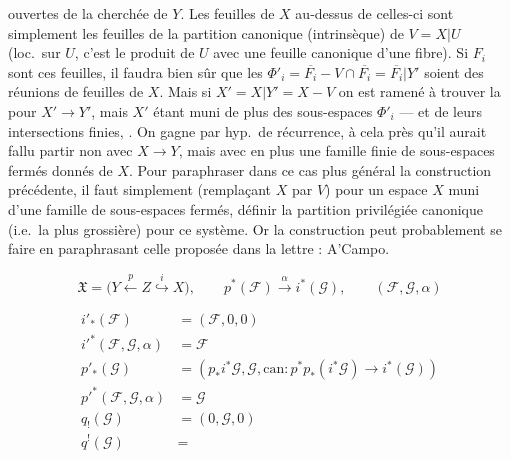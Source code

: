 \documentclass[11pt,a4paper]{article}
\begin{document}
ouvertes de la \struck{\ill{}}  cherchée de $Y$. Les feuilles
de $X$ au-dessus de celles-ci sont simplement les feuilles de la partition
 canonique (intrinsèque) de $V = X | U$ (loc.\ sur $U$,
c'est le produit de $U$ avec une feuille canonique d'une fibre). Si $F_i$
sont ces feuilles, il faudra bien sûr que les $\Phi'_i = \overline{F_i} - V
\cap \overline{F_i} = \overline{F_i} | Y'$ soient des réunions de feuilles
de $X$. Mais si $X' = X | Y' = X - V$ on est ramené à trouver la
\struck{\ill{}}  pour $X' \to Y'$, mais $X'$ étant
muni de plus des sous-espaces $\Phi'_i$ --- et de leurs intersections
finies, . On gagne par hyp.\ de récurrence, à cela près
qu'il aurait fallu partir non avec $X \to Y$, mais avec en plus une famille
finie de sous-espaces fermés donnés de $X$. Pour paraphraser dans ce cas
plus général la construction précédente, il faut simplement (remplaçant $X$
par $V$) pour un espace $X$ muni d'une famille  \struck{\ill{}}
de sous-espaces fermés, définir la \struck{\ill{}} partition privilégiée
canonique (i.e.\ la plus grossière) pour ce système. Or la construction
peut probablement se faire en paraphrasant celle proposée dans la
 lettre : A'Campo.


\[
  \mathfrak{X} = \bigl( Y \xleftarrow{\;p\;} Z \overset{i}{\hookrightarrow} X
  \bigr), \qquad p^{*}(\mathcal{F}) \xrightarrow{\;\alpha\;}
  i^{*}(\mathcal{G}), \qquad (\mathcal{F}, \mathcal{G}, \alpha)
\]

\struck{\ill{}}
\begin{align*}
  i'_{*}(\mathcal{F}) &= (\mathcal{F}, 0, 0) \\
  i'^{*}(\mathcal{F}, \mathcal{G}, \alpha) &= \mathcal{F} \\
  p'_{*}(\mathcal{G}) &= (p_{*} i^{*} \mathcal{G}, \mathcal{G},
  \mathrm{can} : p^{*} p_{*}(i^{*}\mathcal{G}) \to i^{*}(\mathcal{G})) \\
  p'^{*}(\mathcal{F}, \mathcal{G}, \alpha) &= \mathcal{G} \\
  q_{!}(\mathcal{G}) &= (0, \mathcal{G}, 0) \\
  q^{!}(\mathcal{G}) &=
\end{align*}
\end{document}
